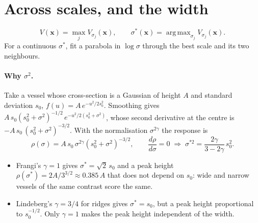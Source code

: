 \documentclass[11pt]{article}
\newcommand{\x}{\mathbf{x}}
\DeclareMathOperator*{\argmax}{arg\,max}
\begin{document}
\section{Across scales, and the width}\label{sec:width}

\begin{equation}
  V(\x) = \max_j V_{\sigma_j}(\x), \qquad \sigma^*(\x) = \argmax_{\sigma_j} V_{\sigma_j}(\x).
\end{equation}
For a continuous $\sigma^*$, fit a parabola in $\log\sigma$ through the best scale and its two neighbours.

\paragraph{Why $\sigma^2$.} Take a vessel whose cross-section is a Gaussian of height $A$ and standard deviation
$s_0$, $f(u) = A\, e^{-u^2/2s_0^2}$. Smoothing gives
$A\, s_0 (s_0^2 + \sigma^2)^{-1/2}\, e^{-u^2/2(s_0^2 + \sigma^2)}$, whose second derivative at the centre is
$-A\, s_0\, (s_0^2 + \sigma^2)^{-3/2}$. With the normalisation $\sigma^{2\gamma}$ the response is
\begin{equation}
  \rho(\sigma) = A\, s_0\, \sigma^{2\gamma} \left(s_0^2 + \sigma^2\right)^{-3/2},
  \qquad
  \frac{d\rho}{d\sigma} = 0 \;\Longrightarrow\; \sigma^{*2} = \frac{2\gamma}{3 - 2\gamma}\, s_0^2 .
\end{equation}
\begin{itemize}
  \item Frangi's $\gamma = 1$ gives $\sigma^* = \sqrt 2\, s_0$ and a peak height $\rho(\sigma^*) = 2A/3^{3/2} \approx
        0.385\,A$ that does not depend on $s_0$: wide and narrow vessels of the same contrast score the same.
  \item Lindeberg's $\gamma = 3/4$ for ridges gives $\sigma^* = s_0$, but a peak height proportional to
        $s_0^{-1/2}$. Only $\gamma = 1$ makes the peak height independent of the width.
\end{itemize}
\end{document}
